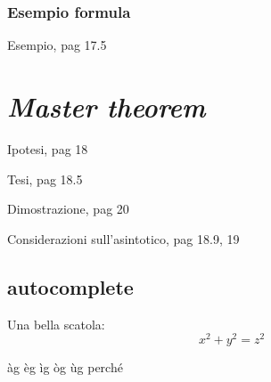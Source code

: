 \subsubsection{Esempio formula}
Esempio, pag 17.5

\section{\textit{Master theorem}}
Ipotesi, pag 18

Tesi, pag 18.5

Dimostrazione, pag 20

Considerazioni sull'asintotico, pag 18.9, 19

\subsection{autocomplete}
Una bella scatola:
\begin{equation}
    \boxed{x^2+y^2 = z^2}
\end{equation}

àg
èg
ìg
òg
ùg
perché

